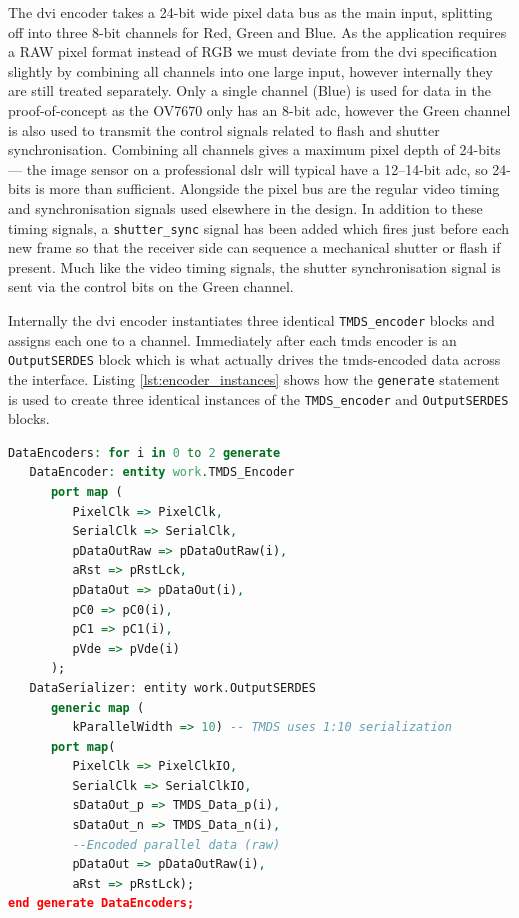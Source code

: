 The \gls{dvi} encoder takes a 24-bit wide pixel data bus as the main input, splitting off into three 8-bit channels for Red, Green and Blue. As the application requires a RAW pixel format instead of RGB we must deviate from the \gls{dvi} specification slightly by combining all channels into one large input, however internally they are still treated separately. Only a single channel (Blue) is used for data in the proof-of-concept as the OV7670 only has an 8-bit \gls{adc}, however the Green channel is also used to transmit the control signals related to flash and shutter synchronisation. Combining all channels gives a maximum pixel depth of 24-bits --- the image sensor on a professional \gls{dslr} will typical have a 12--14-bit \gls{adc}, so 24-bits is more than sufficient. Alongside the pixel bus are the regular video timing and synchronisation signals used elsewhere in the design. In addition to these timing signals, a \texttt{shutter\_sync} signal has been added which fires just before each new frame so that the receiver side can sequence a mechanical shutter or flash if present. Much like the video timing signals, the shutter synchronisation signal is sent via the control bits on the Green channel.

Internally the \gls{dvi} encoder instantiates three identical \texttt{TMDS\_encoder} blocks and assigns each one to a channel. Immediately after each \gls{tmds} encoder is an \texttt{OutputSERDES} block which is what actually drives the \gls{tmds}-encoded data across the interface. Listing \ref{lst:encoder_instances} shows how the \texttt{generate} statement is used to create three identical instances of the \texttt{TMDS\_encoder} and \texttt{OutputSERDES} blocks.

\begin{lstlisting}[caption={Instantiatiating a TMDS encoder and serialiser for each channel.}, label={lst:encoder_instances}, language=VHDL]
DataEncoders: for i in 0 to 2 generate
   DataEncoder: entity work.TMDS_Encoder
      port map (
         PixelClk => PixelClk,
         SerialClk => SerialClk,
         pDataOutRaw => pDataOutRaw(i),
         aRst => pRstLck,
         pDataOut => pDataOut(i),
         pC0 => pC0(i),
         pC1 => pC1(i),
         pVde => pVde(i)
      );
   DataSerializer: entity work.OutputSERDES
      generic map (
         kParallelWidth => 10) -- TMDS uses 1:10 serialization
      port map(
         PixelClk => PixelClkIO,
         SerialClk => SerialClkIO,
         sDataOut_p => TMDS_Data_p(i),
         sDataOut_n => TMDS_Data_n(i),
         --Encoded parallel data (raw)
         pDataOut => pDataOutRaw(i),
         aRst => pRstLck);      
end generate DataEncoders;
\end{lstlisting} 

